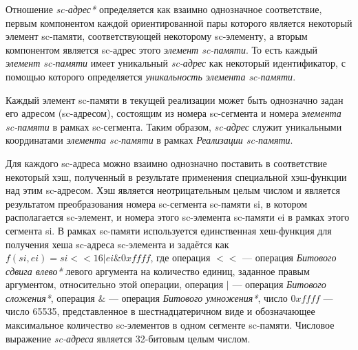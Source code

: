 Отношение \textit{sc-адрес*} определяется как взаимно однозначное соответствие, первым компонентом каждой ориентированной пары которого является некоторый элемент sc-памяти, соответствующей некоторому sc-элементу, а вторым компонентом является sc-адрес этого \textit{элемент sc-памяти}. То есть каждый \textit{элемент sc-памяти} имеет уникальный \textit{sc-адрес} как некоторый идентификатор, с помощью которого определяется \textit{уникальность элемента sc-памяти}.

Каждый элемент sc-памяти в текущей реализации может быть однозначно задан его адресом (sc-адресом), состоящим из номера sc-сегмента и номера \textit{элемента sc-памяти} в рамках sc-сегмента. Таким образом, \textit{sc-адрес} служит уникальными координатами \textit{элемента sc-памяти} в рамках \textit{Реализации sc-памяти}.

Для каждого sc-адреса можно взаимно однозначно поставить в соответствие некоторый хэш, полученный в результате применения специальной хэш-функции над этим sc-адресом. Хэш является неотрицательным целым числом и является результатом преобразования номера sc-сегмента sc-памяти si, в котором располагается sc-элемент, и номера этого sc-элемента sc-памяти ei в рамках этого сегмента si. В рамках sc-памяти используется единственная хеш-функция для получения хеша sc-адреса sc-элемента и задаётся как $f(si, ei) = si << 16 | ei \& 0xffff$, где операция $<<$ --- операция \textit{Битового сдвига влево*} левого аргумента на количество единиц, заданное правым аргументом, относительно этой операции, операция $|$ --- операция \textit{Битового сложения*}, операция $\&$ --- операция \textit{Битового умножения*}, число $0xffff$ --- число 65535, представленное в шестнадцатеричном виде и обозначающее максимальное количество sc-элементов в одном сегменте sc-памяти. Числовое выражение \textit{sc-адреса} является 32-битовым целым числом.

\begin{SCn}
\end{SCn}

